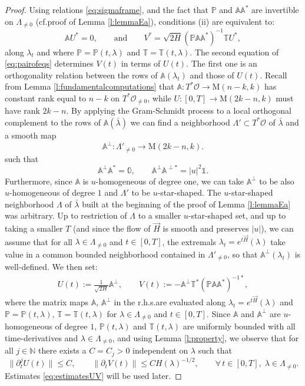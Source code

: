 \documentclass[11pt,a4paper]{article}
\theoremstyle{plain}
\theoremstyle{definition}
\theoremstyle{remark}
\numberwithin{equation}{section}
\newcommand{\N}{\mathbb{N}} %
\newcommand{\A}{\mathbb{A}}
\renewcommand{\P}{\mathbb{P}}
\begin{document}
\begin{proof}
Using relations \eqref{eq:sigmaframe}, and the fact that $\P$ and $\A\A^*$ are invertible on $\Lambda_{\neq 0}$ (cf.\@ proof of Lemma \ref{l:lemmaEa}), conditions (ii) are equivalent to:
\begin{equation}\label{eq:pairofeqs}
\A U^* = 0, \qquad \text{and}\qquad V^* = \sqrt{2H}(\P\A\A^*)^{-1}\mathbb{T}U^*,
\end{equation}
along $\lambda_t$ and where $\P = \P(t,\lambda)$ and $\mathbb{T} = \mathbb{T}(t,\lambda)$.
The second equation of \eqref{eq:pairofeqs} determines $V(t)$ in terms of $U(t)$. The first one is an orthogonality relation between the rows of $\A(\lambda_t)$ and those of $U(t)$. Recall from Lemma \ref{l:fundamentalcomputations} that $\A : T^*\mathcal{O} \to \mathrm{M}(n-k,k)$ has constant rank equal to $n-k$ on $T^*\mathcal{O}_{\neq 0}$, while $U: [0,T]\to \mathrm{M}(2k-n,k)$ must have rank $2k-n$. By applying the Gram-Schmidt process to a local orthogonal complement to the rows of $\A(\bar{\lambda})$ we can find a neighborhood $\Lambda' \subset T^*\mathcal{O}$ of $\bar{\lambda}$ and a smooth map
\begin{equation}
\A^\perp : \Lambda'_{\neq 0} \to \mathrm{M}(2k-n,k).
\end{equation}
such that 
\begin{equation}\label{eq:propertiesA}
\A^\perp \A^* = \mathbb{0}, \qquad \A^\perp \A^{\perp *} = |u|^2 \mathbb{1}.
\end{equation}
Furthermore, since $\A$ is $u$-homogeneous of degree one, we can take $\A^\perp$ to be also $u$-homogeneous of degree $1$ and $\Lambda'$ to be $u$-star-shaped. The $u$-star-shaped neighborhood $\Lambda$ of $\bar{\lambda}$ built at the beginning of the proof of Lemma \ref{l:lemmaEa} was arbitrary. Up to restriction of $\Lambda$ to a smaller $u$-star-shaped set, and up to taking a smaller $T$ (and since the flow of $\vec{H}$ is smooth and preserves $|u|$), we can assume that for all $\lambda \in \Lambda_{\neq 0}$ and $t\in [0,T]$, the extremals $\lambda_t = e^{t\vec{H}}(\lambda)$ take value in a common bounded neighborhood contained in $\Lambda'_{\neq 0}$, so that $\A^\perp(\lambda_t)$ is well-defined. We then set:
\begin{align}\label{eq:UandV}
U(t) := \frac{1}{\sqrt{2H}}\A^{\perp}, \qquad V(t)  :=-\A^{\perp}\mathbb{T}^*(\P\A\A^*)^{-1*},
\end{align}
where the matrix maps $\A$, $\A^\perp$ in the r.h.s.\@ are evaluated along $\lambda_t = e^{t\vec{H}}(\lambda)$ and $\P = \P(t,\lambda)$, $\mathbb{T}=\mathbb{T}(t,\lambda)$ for $\lambda \in \Lambda_{\neq 0}$ and $t\in [0,T]$. Since $\A$ and $\A^\perp$ are $u$-homogeneous of degree $1$, $\P(t,\lambda)$ and $\mathbb{T}(t,\lambda)$ are uniformly bounded with all time-derivatives and $\lambda \in \Lambda_{\neq 0}$, and using Lemma \ref{l:property}, we observe that for all $j\in \N$ there exists a $C=C_j>0$ independent on $\lambda$ such that
\begin{equation}\label{eq:estimatesUV}
\|\partial_t^j U(t)\| \leq C, \qquad \|\partial_t V(t)\| \leq C H(\lambda)^{-1/2}, \qquad \forall\, t\in [0,T],\; \lambda \in \Lambda_{\neq 0}.
\end{equation}
Estimates \eqref{eq:estimatesUV} will be used later.


\end{proof}
\end{document}
